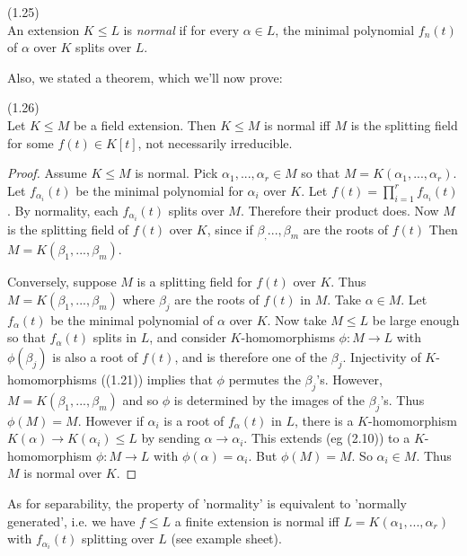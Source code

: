 \documentclass[a4paper]{article}
\begin{document}
\begin{defi} (1.25)\\
An extension $K \leq L$ is \emph{normal} if for every $\alpha \in L$, the minimal polynomial $f_n(t)$ of $\alpha$ over $K$ splits over $L$.
\end{defi}

Also, we stated a theorem, which we'll now prove:
\begin{thm} (1.26)\\
Let $K \leq M$ be a field extension. Then $K\leq M$ is normal iff $M$ is the splitting field for some $f(t) \in K[t]$, not necessarily irreducible.
\begin{proof}
Assume $K \leq M$ is normal. Pick $\alpha_1,...,\alpha_r \in M$ so that $M = K(\alpha_1,...,\alpha_r)$. Let $f_{\alpha_i} (t)$  be the minimal polynomial for $\alpha_i$ over $K$. Let $f(t) = \prod_{i=1}^r f_{\alpha_i}(t)$. By normality, each $f_{\alpha_i}(t)$ splits over $M$. Therefore their product does. Now $M$ is the splitting field of $f(t)$ over $K$, since if $\beta_,...,\beta_m$ are the roots of $f(t)$ Then $M=K(\beta_1,...,\beta_m)$.

Conversely, suppose $M$ is a splitting field for $f(t)$ over $K$. Thus $M = K(\beta_1,...,\beta_m)$ where $\beta_j$ are the roots of $f(t)$ in $M$. Take $\alpha \in M$. Let $f_\alpha (t)$ be the minimal polynomial of $\alpha$ over $K$. Now take $M \leq L$ be large enough so that $f_\alpha(t)$ splits in $L$, and consider $K$-homomorphisms $\phi:M \to L$ with $\phi(\beta_j)$ is also a root of $f(t)$, and is therefore one of the $\beta_j$. Injectivity of $K$-homomorphisms ((1.21)) implies that $\phi$ permutes the $\beta_j$'s. However, $M = K(\beta_1,...,\beta_m)$ and so $\phi$ is determined by the images of the $\beta_j$'s. Thus $\phi(M) = M$. However if $\alpha_i$ is a root of $f_\alpha(t)$ in $L$, there is a $K$-homomorphism $K(\alpha) \to K(\alpha_i) \leq L$ by sending $\alpha \to \alpha_i$. This extends (eg (2.10)) to a $K$-homomorphism $\phi:M \to L$ with $\phi(\alpha) = \alpha_i$. But $\phi(M) = M$. So $\alpha_i \in M$. Thus $M$ is normal over $K$.
\end{proof}
\end{thm}

\begin{rem}
As for separability, the property of 'normality' is equivalent to 'normally generated', i.e. we have $f \leq L$ a finite extension is normal iff $L=K(\alpha_1,...,\alpha_r)$ with $f_{\alpha_i}(t)$ splitting over $L$  (see example sheet).
\end{rem}
\end{document}
